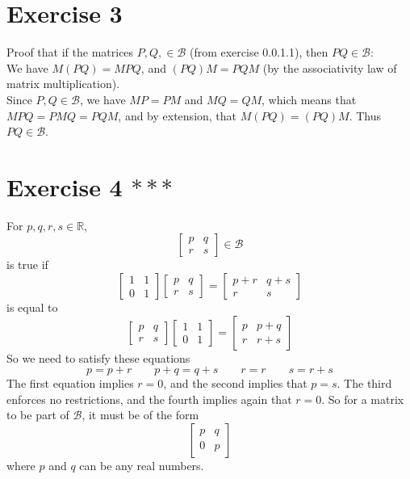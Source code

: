 \documentclass[12pt]{article}
\newcommand{\R}{\mathbb{R}}
\begin{document}
    \section*{Exercise 3}
    Proof that if the matrices $P, Q, \in \mathcal{B}$
    (from exercise 0.0.1.1),
    then $PQ \in \mathcal{B}$: \\
    We have $M(PQ) = MPQ$, and $(PQ)M = PQM$
    (by the associativity law of matrix multiplication). \\
    Since $P, Q \in \mathcal{B}$,
    we have $MP = PM$ and $MQ = QM$,
    which means that $MPQ = PMQ = PQM$,
    and by extension, that $M(PQ) = (PQ)M$.
    Thus $PQ \in \mathcal{B}$. \\ 

    \section*{Exercise 4 $***$}
    For $p, q, r, s \in \R$,
    \[ \begin{bmatrix}
        p & q \\
        r & s
    \end{bmatrix} \in \mathcal{B} \]
    is true if 
    \[  \begin{bmatrix}
        1 & 1 \\
        0 & 1
    \end{bmatrix}
    \begin{bmatrix}
        p & q \\
        r & s
    \end{bmatrix} 
    = \begin{bmatrix}
        p + r & q + s \\
        r & s
    \end{bmatrix} \]
    is equal to
    \[
        \begin{bmatrix}
        p & q \\
        r & s
    \end{bmatrix}
    \begin{bmatrix}
        1 & 1 \\
        0 & 1
    \end{bmatrix}
    =  \begin{bmatrix}
        p & p + q \\
        r & r + s
    \end{bmatrix} \]
    So we need to satisfy these equations
    \[ p = p + r \qquad p + q = q + s 
    \qquad r = r \qquad s = r + s \]
    The first equation implies $r = 0$,
    and the second implies that $p = s$.
    The third enforces no restrictions,
    and the fourth implies again that $r = 0$.
    So for a matrix to be part of $\mathcal{B}$,
    it must be of the form
    \[ \begin{bmatrix}
        p & q \\
        0 & p
    \end{bmatrix} \]
    where $p$ and $q$ can be any real numbers. \\
\end{document}
